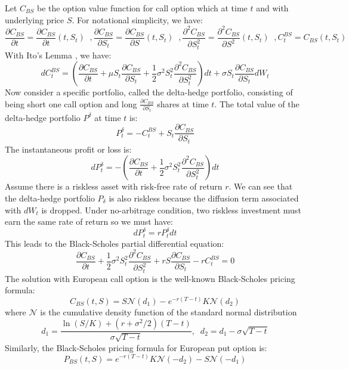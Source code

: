 \documentclass[letterpaper,12pt,titlepage,oneside,final]{book}
\numberwithin{equation}{section}
\theoremstyle{definition}
\begin{document}
Let $C_{BS}$ be the option value function for call option which at time $t$ and with underlying price $S$. 
For notational simplicity, we have:
\[
   \frac{\partial C_{BS}}{\partial t}=\frac{\partial C_{BS}}{\partial t}(t,S_t) \;\;,
   \frac{\partial C_{BS}}{\partial S_t}=\frac{\partial C_{BS}}{\partial S}(t,S_t) \;\;,
   \frac{\partial^2 C_{BS}}{\partial S_t^2}=\frac{\partial^2 C_{BS}}{\partial S^2}(t,S_t) \;\;,
   C^{BS}_t=C_{BS}(t,S_t)
\]
With Ito's Lemma \cite{shreve2004stochastic}, we have:
\[
dC^{BS}_t=\left(\frac{\partial C_{BS}}{\partial t}+\mu S_t \frac{\partial C_{BS}}{\partial S_t}+\frac{1}{2} \sigma^2 S_t^2 \frac{\partial ^2 C_{BS}}{ \partial S_t^2}\right) dt+\sigma S_t \frac{\partial C_{BS}}{\partial S_t}dW_t
\]
 Now consider a specific portfolio, called the delta-hedge portfolio, consisting of being short one call option and long $\frac{\partial C_{BS}}{\partial S_t}$ shares at time $t$.
The total value of the delta-hedge portfolio $P^{\delta}$ at time $t$ is:
\[
P^{\delta}_t=-C^{BS}_t+S_t \frac{\partial C_{BS}}{\partial S_t}
\]
The instantaneous profit or loss is:
\[
dP^{\delta}_t=-\left(\frac{\partial C_{BS}}{ \partial t} +\frac{1}{2} \sigma^2 S_t^2 \frac{\partial^2 C_{BS}}{ \partial S_t^2 } \right) dt
\]
Assume there is a riskless asset with risk-free rate of return $r$. We can see that the delta-hedge portfolio $P_{\delta}$ is also riskless because the diffusion term associated with $dW_t$ is dropped. Under no-arbitrage condition, two riskless investment must earn the same rate of return so we must have:
\[
dP^{\delta}_{t}=rP^{\delta}_tdt
\]
This leads to the Black-Scholes partial differential equation:
\begin{equation}
\frac{\partial C_{BS}}{\partial t}+\frac{1}{2}\sigma^2 S_t^2 \frac{\partial^2 C_{BS}}{\partial S_t^2}+rS \frac{\partial C_{BS}}{\partial S_t}-rC^{BS}_t=0
\label{eq:bspde}
\end{equation}
The solution with European call option  is the well-known Black-Scholes pricing formula:
\begin{equation}
C_{BS}(t,S)=S  \mathcal{N}(d_1)-e^{-r(T-t)}  K  \mathcal{N}(d_2)
\label{eq:bs}
\end{equation}
where $\mathcal{N}$ is the cumulative density function of the standard normal distribution
\[
d_1=\frac{\ln(S/K)+(r+\sigma^2/2)(T-t)}{\sigma \sqrt{T-t}}, \;\; d_2=d_1-\sigma  \sqrt{T-t}
\]
Similarly, the Black-Scholes pricing formula for  European put option is:
\begin{equation}
P_{BS}(t,S)=e^{-r(T-t)}  K   \mathcal{N}(-d_2)-S  \mathcal{N}(-d_1)
\label{eq:bsP}
\end{equation}
\end{document}
